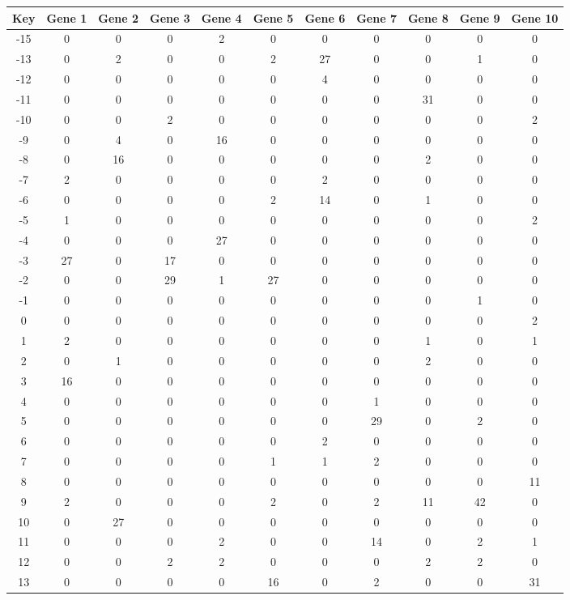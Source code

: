\begin{tabular}{|c|c|c|c|c|c|c|c|c|c|c|}
\hline
Key & Gene 1 & Gene 2 & Gene 3 & Gene 4 & Gene 5 & Gene 6 & Gene 7 & Gene 8 & Gene 9 & Gene 10 \\
\hline
-15 & 0 & 0 & 0 & 2 & 0 & 0 & 0 & 0 & 0 & 0 \\
-13 & 0 & 2 & 0 & 0 & 2 & 27 & 0 & 0 & 1 & 0 \\
-12 & 0 & 0 & 0 & 0 & 0 & 4 & 0 & 0 & 0 & 0 \\
-11 & 0 & 0 & 0 & 0 & 0 & 0 & 0 & 31 & 0 & 0 \\
-10 & 0 & 0 & 2 & 0 & 0 & 0 & 0 & 0 & 0 & 2 \\
-9 & 0 & 4 & 0 & 16 & 0 & 0 & 0 & 0 & 0 & 0 \\
-8 & 0 & 16 & 0 & 0 & 0 & 0 & 0 & 2 & 0 & 0 \\
-7 & 2 & 0 & 0 & 0 & 0 & 2 & 0 & 0 & 0 & 0 \\
-6 & 0 & 0 & 0 & 0 & 2 & 14 & 0 & 1 & 0 & 0 \\
-5 & 1 & 0 & 0 & 0 & 0 & 0 & 0 & 0 & 0 & 2 \\
-4 & 0 & 0 & 0 & 27 & 0 & 0 & 0 & 0 & 0 & 0 \\
-3 & 27 & 0 & 17 & 0 & 0 & 0 & 0 & 0 & 0 & 0 \\
-2 & 0 & 0 & 29 & 1 & 27 & 0 & 0 & 0 & 0 & 0 \\
-1 & 0 & 0 & 0 & 0 & 0 & 0 & 0 & 0 & 1 & 0 \\
0 & 0 & 0 & 0 & 0 & 0 & 0 & 0 & 0 & 0 & 2 \\
1 & 2 & 0 & 0 & 0 & 0 & 0 & 0 & 1 & 0 & 1 \\
2 & 0 & 1 & 0 & 0 & 0 & 0 & 0 & 2 & 0 & 0 \\
3 & 16 & 0 & 0 & 0 & 0 & 0 & 0 & 0 & 0 & 0 \\
4 & 0 & 0 & 0 & 0 & 0 & 0 & 1 & 0 & 0 & 0 \\
5 & 0 & 0 & 0 & 0 & 0 & 0 & 29 & 0 & 2 & 0 \\
6 & 0 & 0 & 0 & 0 & 0 & 2 & 0 & 0 & 0 & 0 \\
7 & 0 & 0 & 0 & 0 & 1 & 1 & 2 & 0 & 0 & 0 \\
8 & 0 & 0 & 0 & 0 & 0 & 0 & 0 & 0 & 0 & 11 \\
9 & 2 & 0 & 0 & 0 & 2 & 0 & 2 & 11 & 42 & 0 \\
10 & 0 & 27 & 0 & 0 & 0 & 0 & 0 & 0 & 0 & 0 \\
11 & 0 & 0 & 0 & 2 & 0 & 0 & 14 & 0 & 2 & 1 \\
12 & 0 & 0 & 2 & 2 & 0 & 0 & 0 & 2 & 2 & 0 \\
13 & 0 & 0 & 0 & 0 & 16 & 0 & 2 & 0 & 0 & 31 \\
\hline
\end{tabular}